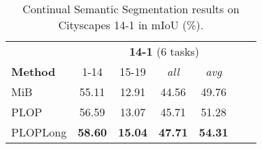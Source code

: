 \begin{table}[t]
    \centering
    \begin{tabular}{@{}l|cc|cccc@{}}
        \toprule
                                                      & \multicolumn{6}{c}{\textbf{14-1} (6 tasks)}                                                    \\
        \textbf{Method}                               & 1-14                                        & 15-19          & \textit{all}   & \textit{avg}   \\
        \midrule
        MiB \citep{cermelli2020modelingthebackground} & 55.11                                       & 12.91          & 44.56          & 49.76          \\
        PLOP                                          & 56.59                                       & 13.07          & 45.71          & 51.28          \\
        PLOPLong                                      & \textbf{58.60}                              & \textbf{15.04} & \textbf{47.71} & \textbf{54.31} \\
        \bottomrule
    \end{tabular}
    \caption{Continual Semantic Segmentation results on Cityscapes 14-1 in \ac{mIoU} (\%).}
    \label{tab:seg_cityscapes_class}
\end{table}
